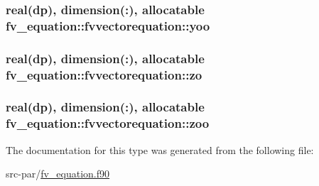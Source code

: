 \hypertarget{structfv__equation_1_1fvvectorequation_a1631b0c62d09b603309dfa754a31a7fd}{
\subsubsection[{yoo}]{\setlength{\rightskip}{0pt plus 5cm}real(dp), dimension(\-:), allocatable fv\-\_\-equation\-::fvvectorequation\-::yoo}}\label{structfv__equation_1_1fvvectorequation_a1631b0c62d09b603309dfa754a31a7fd}
\hypertarget{structfv__equation_1_1fvvectorequation_a6722be7e3093855814a40ce85ec58508}{
\subsubsection[{zo}]{\setlength{\rightskip}{0pt plus 5cm}real(dp), dimension(\-:), allocatable fv\-\_\-equation\-::fvvectorequation\-::zo}}\label{structfv__equation_1_1fvvectorequation_a6722be7e3093855814a40ce85ec58508}
\hypertarget{structfv__equation_1_1fvvectorequation_a890fa380a32227ef9e1b33590357076c}{
\subsubsection[{zoo}]{\setlength{\rightskip}{0pt plus 5cm}real(dp), dimension(\-:), allocatable fv\-\_\-equation\-::fvvectorequation\-::zoo}}\label{structfv__equation_1_1fvvectorequation_a890fa380a32227ef9e1b33590357076c}


The documentation for this type was generated from the following file\-:\begin{DoxyCompactItemize}
\item 
src-\/par/\hyperlink{fv__equation_8f90}{fv\-\_\-equation.\-f90}\end{DoxyCompactItemize}
